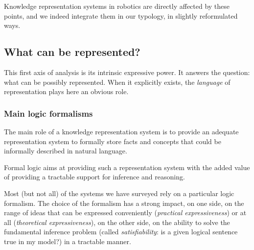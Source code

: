 Knowledge representation systems in robotics are directly affected by these
points, and we indeed integrate them in our typology, in slightly reformulated
ways.


\subsection{What can be represented?}
\label{sect|expressiveness}

\begin{scriptsize}
\begin{center}
\end{center}
\end{scriptsize}

This first axis of analysis is its intrinsic expressive power. It answers the
question: what can be possibly represented. When it explicitly exists, the
\emph{language} of representation plays here an obvious role.

\subsubsection{Main logic formalisms}

The main role of a knowledge representation system is to provide an adequate
representation system to formally store facts and concepts that could be informally
described in natural language.

Formal logic aims at providing such a representation system with the added
value of providing a tractable support for inference and reasoning.

Most (but not all) of the systems we have surveyed rely on a particular logic
formalism. The choice of the formalism has a strong impact, on one side, on the
range of ideas that can be expressed conveniently (\emph{practical
expressiveness}) or at all (\emph{theoretical expressiveness}), on the other
side, on the ability to solve the fundamental inference problem (called
\emph{satisfiability}: is a given logical sentence true in my model?) in a
tractable manner.

